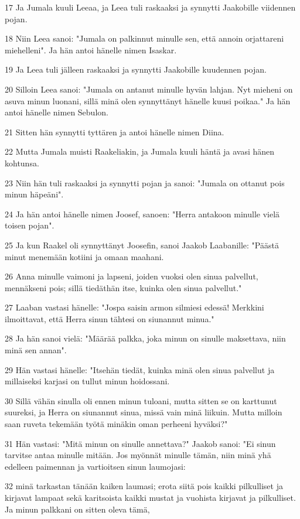 \par 17 Ja Jumala kuuli Leeaa, ja Leea tuli raskaaksi ja synnytti Jaakobille viidennen pojan.
\par 18 Niin Leea sanoi: "Jumala on palkinnut minulle sen, että annoin orjattareni miehelleni". Ja hän antoi hänelle nimen Isaskar.
\par 19 Ja Leea tuli jälleen raskaaksi ja synnytti Jaakobille kuudennen pojan.
\par 20 Silloin Leea sanoi: "Jumala on antanut minulle hyvän lahjan. Nyt mieheni on asuva minun luonani, sillä minä olen synnyttänyt hänelle kuusi poikaa." Ja hän antoi hänelle nimen Sebulon.
\par 21 Sitten hän synnytti tyttären ja antoi hänelle nimen Diina.
\par 22 Mutta Jumala muisti Raakeliakin, ja Jumala kuuli häntä ja avasi hänen kohtunsa.
\par 23 Niin hän tuli raskaaksi ja synnytti pojan ja sanoi: "Jumala on ottanut pois minun häpeäni".
\par 24 Ja hän antoi hänelle nimen Joosef, sanoen: "Herra antakoon minulle vielä toisen pojan".
\par 25 Ja kun Raakel oli synnyttänyt Joosefin, sanoi Jaakob Laabanille: "Päästä minut menemään kotiini ja omaan maahani.
\par 26 Anna minulle vaimoni ja lapseni, joiden vuoksi olen sinua palvellut, mennäkseni pois; sillä tiedäthän itse, kuinka olen sinua palvellut."
\par 27 Laaban vastasi hänelle: "Jospa saisin armon silmiesi edessä! Merkkini ilmoittavat, että Herra sinun tähtesi on siunannut minua."
\par 28 Ja hän sanoi vielä: "Määrää palkka, joka minun on sinulle maksettava, niin minä sen annan".
\par 29 Hän vastasi hänelle: "Itsehän tiedät, kuinka minä olen sinua palvellut ja millaiseksi karjasi on tullut minun hoidossani.
\par 30 Sillä vähän sinulla oli ennen minun tuloani, mutta sitten se on karttunut suureksi, ja Herra on siunannut sinua, missä vain minä liikuin. Mutta milloin saan ruveta tekemään työtä minäkin oman perheeni hyväksi?"
\par 31 Hän vastasi: "Mitä minun on sinulle annettava?" Jaakob sanoi: "Ei sinun tarvitse antaa minulle mitään. Jos myönnät minulle tämän, niin minä yhä edelleen paimennan ja vartioitsen sinun laumojasi:
\par 32 minä tarkastan tänään kaiken laumasi; erota siitä pois kaikki pilkulliset ja kirjavat lampaat sekä karitsoista kaikki mustat ja vuohista kirjavat ja pilkulliset. Ja minun palkkani on sitten oleva tämä,
